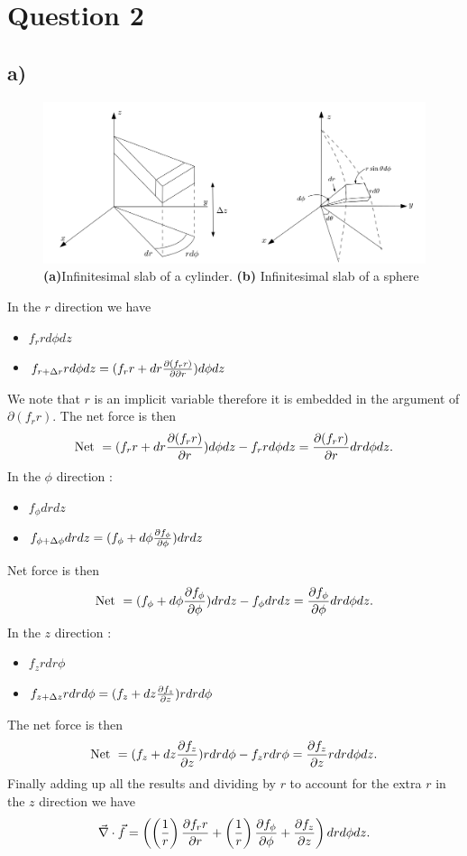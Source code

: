 \documentclass[
	12pt,
	]{article}
\theoremstyle{definition}
\theoremstyle{definition}
\theoremstyle{definition}
\theoremstyle{definition}
\theoremstyle{definition}
\theoremstyle{example}
\theoremstyle{note}
\theoremstyle{remark}
\theoremstyle{example}
\begin{document}
			\section*{Question 2}
				\subsection*{a) }
					\begin{figure}[H]
				   		 	   		 	\centering
				   		 	   		 	\includegraphics[width=1.0\linewidth]{PHYS350_Ass1_Cyl_Spher.png}
				   		 	   		 	\captionsetup{margin=1cm, justification=raggedright}\caption{\textbf{(a)}Infinitesimal slab of a cylinder. \textbf{(b)} Infinitesimal slab of a sphere}
		   		 	 \end{figure}
		   		 In the $r$ direction we have 
		   		 \begin{itemize}
		   		 	\item $f_{r} rd\phi dz$
		   		 	\item $f_{r+\Delta r}rd\phi dz = (f_{r}r + dr \pdv{(f_{r} r)}{\partial r}) d\phi dz $
		   		 \end{itemize}
		   		 We note that $r$ is an implicit variable therefore it is embedded in the argument of $\partial (f_{r} r)$. The net force is then 
		   		 $$ \text{Net } = (f_{r}r + dr \pdv{(f_{r} r)}{r}) d\phi dz - f_{r} rd\phi dz = \pdv{(f_{r} r)}{r} dr d\phi dz.$$
		   		 In the $\phi$ direction :
		   		 \begin{itemize}
		   		 	\item $f_{\phi}dr dz$
		   		 	\item $f_{\phi+ \Delta \phi} dr dz = (f_{\phi}+d\phi \pdv{f_{\phi}}{\phi})dr dz$
		   		 \end{itemize}
		   		 Net force is then 
		   		 $$ \text{Net } = (f_{\phi}+d\phi \pdv{f_{\phi}}{\phi})dr dz- f_{\phi}dr dz = \pdv{f_{\phi}}{\phi}dr d\phi dz.$$
		   		 In the $z$ direction : 
		   		 \begin{itemize}
		   		 	\item $f_{z} r dr \phi $
		   		 	\item $f_{z+\Delta z} r dr d\phi = (f_{z}+dz \pdv{f_{z}}{z})r dr d\phi$
		   		 \end{itemize}
		   		 The net force is then 
		   		 $$ \text{Net } = (f_{z}+dz \pdv{f_{z}}{z})r dr d\phi - f_{z} r dr \phi = \pdv{f_{z}}{z} r dr d\phi dz.$$
		   		 Finally adding up all the results and dividing by $r$ to account for the extra $r$ in the $z$ direction we have 
		   		 $$ \vec{\nabla} \cdot \vec{f} = \left(\left(\frac{1}{r}\right)\pdv{f_{r}r}{r} + \left(\frac{1}{r}\right) \pdv{f_{\phi}}{\phi} + \pdv{f_{z}}{z}\right)dr d\phi dz.$$
		   		 
\end{document}
